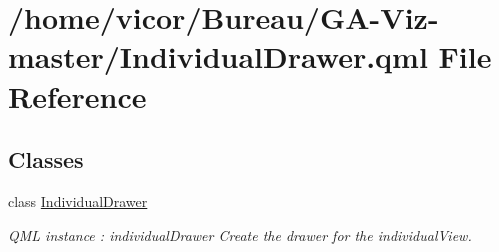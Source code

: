 \hypertarget{_individual_drawer_8qml}{}\section{/home/vicor/\+Bureau/\+G\+A-\/\+Viz-\/master/\+Individual\+Drawer.qml File Reference}
\label{_individual_drawer_8qml}
\subsection*{Classes}
\begin{DoxyCompactItemize}
\item 
class \hyperlink{class_individual_drawer}{Individual\+Drawer}
\begin{DoxyCompactList}\small\item\em Q\+ML instance \+: individual\+Drawer Create the drawer for the individual\+View. \end{DoxyCompactList}\end{DoxyCompactItemize}
